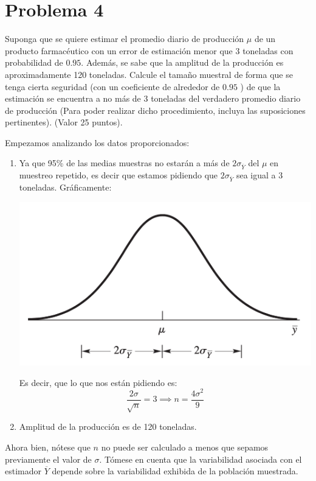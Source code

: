 \section{Problema 4}
Suponga que se quiere estimar el promedio diario de producción $\mu$ de un producto farmacéutico con un error de estimación menor que 3 toneladas con probabilidad de $0.95$. Además, se sabe que la amplitud de la producción es aproximadamente 120 toneladas. Calcule el tamaño muestral de forma que se tenga cierta seguridad (con un coeficiente de alrededor de $0.95$ ) de que la estimación se encuentra a no más de 3 toneladas del verdadero promedio diario de producción (Para poder realizar dicho procedimiento, incluya las suposiciones pertinentes). (Valor 25 puntos).
\begin{solution}
Empezamos analizando los datos proporcionados: 
\begin{enumerate}
    \item Ya que 95\% de las medias muestras no estarán a más de $2\sigma_{\overline{Y}}$ del $\mu$ en muestreo repetido, es decir que estamos pidiendo que $2\sigma_{\overline{Y}}$ sea igual a 3 toneladas. Gráficamente: 
    \begin{center}
        \includegraphics[scale=0.2]{Images/Problema4-1.png}
    \end{center}
    Es decir, que lo que nos están pidiendo es: 
    $$\frac{2\sigma}{\sqrt{n}}=
    3\implies n=\frac{4\sigma^2}{9}$$
    \item Amplitud de la producción es de 120 toneladas. 
\end{enumerate}

\linea 

Ahora bien, nótese que $n$ no puede ser calculado a menos que sepamos previamente el valor de $\sigma$. Tómese en cuenta que la variabilidad asociada con el estimador $\overline{Y}$ depende sobre la variabilidad exhibida de la población muestrada. 


\end{solution}
